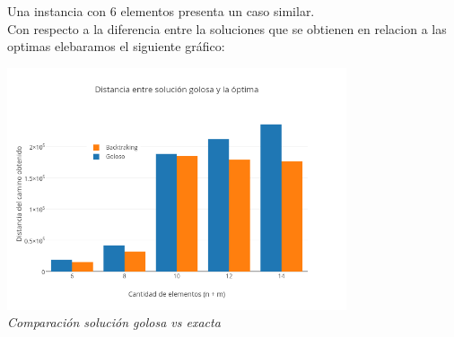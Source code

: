 \begin{figure} [!ht]
 \centering
       \label{fig:anilloexactoerror}
    \label{fig:anillogolosoerror}
    \end{figure}
    
Una instancia con 6 elementos presenta un caso similar.\\

Con respecto a la diferencia entre la soluciones que se obtienen en relacion a las optimas elebaramos el siguiente gráfico:\\
 
\vspace*{0.3cm} \vspace*{0.3cm}
  \begin{center}
 \includegraphics[width=0.75\textwidth]{./EJ2/anillosDif.png}
\\{\textit{Comparación solución golosa vs exacta}}
  \end{center}
  
